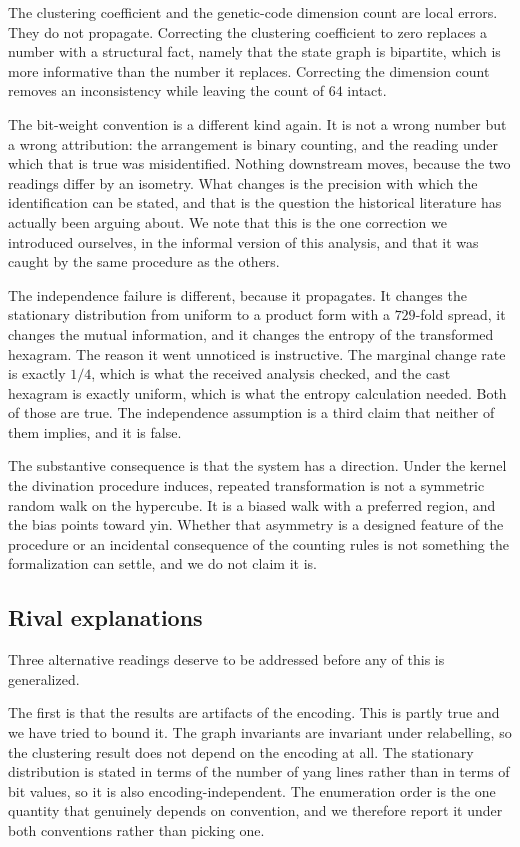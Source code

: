 \documentclass[11pt,a4paper]{article}
\begin{document}
The clustering coefficient and the genetic-code dimension count are local
errors. They do not propagate. Correcting the clustering coefficient to zero
replaces a number with a structural fact, namely that the state graph is
bipartite, which is more informative than the number it replaces. Correcting the
dimension count removes an inconsistency while leaving the count of $64$ intact.

The bit-weight convention is a different kind again. It is not a wrong number but
a wrong attribution: the arrangement is binary counting, and the reading under
which that is true was misidentified. Nothing downstream moves, because the two
readings differ by an isometry. What changes is the precision with which the
identification can be stated, and that is the question the historical literature
has actually been arguing about. We note that this is the one correction we
introduced ourselves, in the informal version of this analysis, and that it was
caught by the same procedure as the others.

The independence failure is different, because it propagates. It changes the
stationary distribution from uniform to a product form with a $729$-fold spread,
it changes the mutual information, and it changes the entropy of the transformed
hexagram. The reason it went unnoticed is instructive. The marginal change rate
is exactly $1/4$, which is what the received analysis checked, and the cast
hexagram is exactly uniform, which is what the entropy calculation needed. Both
of those are true. The independence assumption is a third claim that neither of
them implies, and it is false.

The substantive consequence is that the system has a direction. Under the
kernel the divination procedure induces, repeated transformation is not a
symmetric random walk on the hypercube. It is a biased walk with a preferred
region, and the bias points toward yin. Whether that asymmetry is a designed
feature of the procedure or an incidental consequence of the counting rules is
not something the formalization can settle, and we do not claim it is.

\subsection{Rival explanations}

Three alternative readings deserve to be addressed before any of this is
generalized.

The first is that the results are artifacts of the encoding. This is partly
true and we have tried to bound it. The graph invariants are invariant under
relabelling, so the clustering result does not depend on the encoding at all.
The stationary distribution is stated in terms of the number of yang lines
rather than in terms of bit values, so it is also encoding-independent. The
enumeration order is the one quantity that genuinely depends on convention, and
we therefore report it under both conventions rather than picking one.
\end{document}
